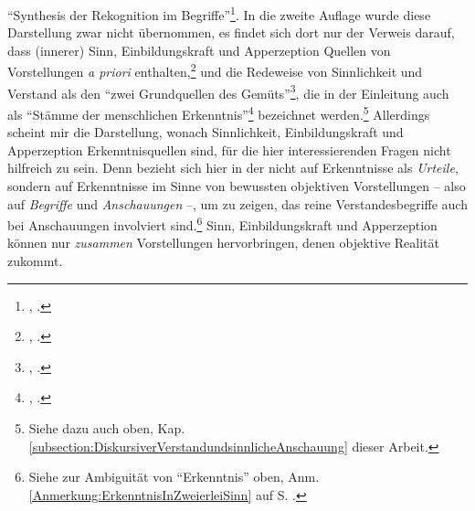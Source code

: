 \enquote{Synthesis der Rekognition im Begriffe}\footnote{\cite[][A
103]{Kant:KritikderreinenVernunft2003},
\cite[][IV: 79.15]{Kant:GesammelteWerke1900ff.}.}.
In die zweite Auflage wurde diese Darstellung zwar nicht übernommen, es findet
sich dort nur der Verweis darauf, dass (innerer) Sinn, Einbildungskraft und
Apperzeption  Quellen von Vorstellungen \emph{a priori}
enthalten,\footnote{\cite[Vgl.][B 194]{Kant:KritikderreinenVernunft2003},
\cite[][III: 144.5--11]{Kant:GesammelteWerke1900ff.}.} und die Redeweise von
Sinnlichkeit und Verstand als den \enquote{zwei Grundquellen des
Gemüts}\footnote{\cite[][B 74]{Kant:KritikderreinenVernunft2003},
\cite[][III: 74.9]{Kant:GesammelteWerke1900ff.}.}, die in der Einleitung auch
als \enquote{Stämme der menschlichen
Erkenntnis}\footnote{\cite[][B 29]{Kant:KritikderreinenVernunft2003},
\cite[][III: 46.7]{Kant:GesammelteWerke1900ff.}.} bezeichnet
werden.\footnote{Siehe dazu auch oben, Kap. \ref{subsection:DiskursiverVerstandundsinnlicheAnschauung} dieser Arbeit.} Allerdings scheint
mir die Darstellung, wonach Sinnlichkeit, Einbildungskraft und Apperzeption Erkenntnisquellen sind,
für die hier interessierenden Fragen nicht hilfreich zu sein. Denn
 bezieht sich hier in der 
nicht auf Erkenntnisse als \emph{Urteile}, sondern auf
Erkenntnisse im Sinne von bewussten objektiven Vorstellungen -- also auf
\emph{Begriffe} und \emph{Anschauungen} --, um zu zeigen, das reine
Verstandesbegriffe auch bei Anschauungen involviert sind.\footnote{Siehe zur
Ambiguität von \enquote{Erkenntnis} oben, Anm.
\ref{Anmerkung:ErkenntnisInZweierleiSinn} auf S.
\pageref{Anmerkung:ErkenntnisInZweierleiSinn}.} Sinn, Einbildungskraft und
Apperzeption können nur \emph{zusammen} Vorstellungen hervorbringen, denen
objektive Realität zukommt.


